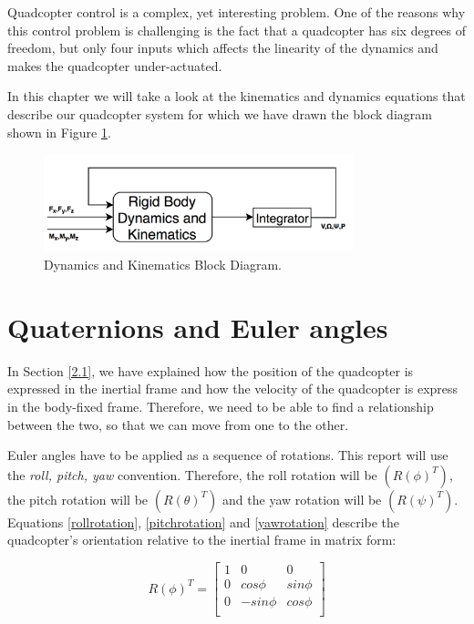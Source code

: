 Quadcopter control is a complex, yet interesting problem. One of the reasons why this control problem is challenging is the fact that a quadcopter has six degrees of freedom, but only four inputs which affects the linearity of the dynamics and makes the quadcopter under-actuated. 

In this chapter we will take a look at the kinematics and dynamics equations that describe our quadcopter system for which we have drawn the block diagram shown in Figure \ref{dk}.

\begin{figure}[H]
  \centering
    \includegraphics[width=0.8\textwidth]{images/blockdiagram.png}
	\caption{Dynamics and Kinematics Block Diagram.}
	\label{dk}
\end{figure}

\section{Quaternions and Euler angles}
In Section \ref{2.1}, we have explained how the position of the quadcopter is expressed in the inertial frame and how the  velocity of the quadcopter is express in the body-fixed frame. Therefore, we need to be able to find a relationship between the two, so that we can move from one to the other.

Euler angles have to be applied as a sequence of rotations. This report will use the \textit{roll, pitch, yaw} convention. Therefore, the roll rotation will be $(R(\phi)^{T})$, the pitch rotation will be $(R(\theta)^{T})$ and the yaw rotation will be $(R(\psi)^{T})$. Equations \ref{rollrotation}, \ref{pitchrotation} and \ref{yawrotation}  describe the quadcopter's orientation relative to the inertial frame in matrix form:

\begin{equation}
\label{rollrotation}	
 	R(\phi)^{T}=\begin{bmatrix}
 	1 & 0 & 0 \\
 	0 & cos\phi & sin\phi \\
 	0 & -sin\phi & cos\phi \\
 	\end{bmatrix}
 \end{equation}
 
